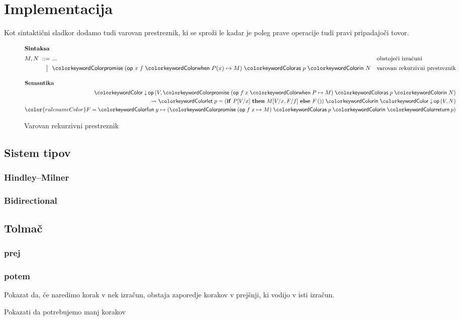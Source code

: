 \section{Implementacija}\label{sec:impl}


Kot sintaktični sladkor dodamo tudi varovan prestreznik, ki se sproži le kadar je poleg prave operacije tudi pravi pripadajoči tovor.
\begin{figure}[h]
	\centering
	\small
	\begin{align*}
	\intertext{\textbf{Sintaksa}}
	M, N
	\bnfis& ...                            & &\text{obstoječi izračuni} \\
	\bnfor& \tmwithrecgu{op}{x}{f}{P(x)}{M}{p}{N}  & &\text{varovan rekurzivni prestreznik}
	\end{align*}
	
	\begin{align*}
	\intertext{\textbf{Semantika}}
	\tmopin{op}{V}{\tmwithrecgu{op}{f}{x}{P}{M}{p}{N}} \\ \reduces \tmlet{p}{(\ite{P[V/x]}{M[V/x, F/f]}{F\,()})}{\tmopin{op}{V}{N}} \\
	{\color{rulenameColor}F = \tmfunano{y}{(\tmwithrec{op}{f}{x}{M}{p}{\tmreturn{p}})}}
	\end{align*}
	
	\caption{Varovan rekurzivni prestreznik}
	\label{fig:izrazi-prestreznik}
\end{figure}

\subsection{Sistem tipov}\label{sec:tipi}

\subsubsection{Hindley–Milner}

\subsubsection{Bidirectional}


\subsection{Tolmač}\label{sec:interpreter}

\subsubsection{prej}

\subsubsection{potem}

Pokazat da, če naredimo korak v nek izračun, obstaja zaporedje korakov v prejšnji, ki vodijo v isti izračun.

Pokazati da potrebujemo manj korakov